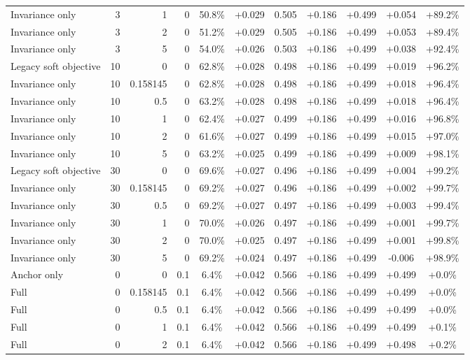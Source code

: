 \begin{table}[htbp]
\begin{tabular}{lrrrccccccc}
Invariance only & 3 & 1 & 0 & 50.8\% & +0.029 & 0.505 & +0.186 & +0.499 & +0.054 & +89.2\% \\
Invariance only & 3 & 2 & 0 & 51.2\% & +0.029 & 0.505 & +0.186 & +0.499 & +0.053 & +89.4\% \\
Invariance only & 3 & 5 & 0 & 54.0\% & +0.026 & 0.503 & +0.186 & +0.499 & +0.038 & +92.4\% \\
Legacy soft objective & 10 & 0 & 0 & 62.8\% & +0.028 & 0.498 & +0.186 & +0.499 & +0.019 & +96.2\% \\
Invariance only & 10 & 0.158145 & 0 & 62.8\% & +0.028 & 0.498 & +0.186 & +0.499 & +0.018 & +96.4\% \\
Invariance only & 10 & 0.5 & 0 & 63.2\% & +0.028 & 0.498 & +0.186 & +0.499 & +0.018 & +96.4\% \\
Invariance only & 10 & 1 & 0 & 62.4\% & +0.027 & 0.499 & +0.186 & +0.499 & +0.016 & +96.8\% \\
Invariance only & 10 & 2 & 0 & 61.6\% & +0.027 & 0.499 & +0.186 & +0.499 & +0.015 & +97.0\% \\
Invariance only & 10 & 5 & 0 & 63.2\% & +0.025 & 0.499 & +0.186 & +0.499 & +0.009 & +98.1\% \\
Legacy soft objective & 30 & 0 & 0 & 69.6\% & +0.027 & 0.496 & +0.186 & +0.499 & +0.004 & +99.2\% \\
Invariance only & 30 & 0.158145 & 0 & 69.2\% & +0.027 & 0.496 & +0.186 & +0.499 & +0.002 & +99.7\% \\
Invariance only & 30 & 0.5 & 0 & 69.2\% & +0.027 & 0.497 & +0.186 & +0.499 & +0.003 & +99.4\% \\
Invariance only & 30 & 1 & 0 & 70.0\% & +0.026 & 0.497 & +0.186 & +0.499 & +0.001 & +99.7\% \\
Invariance only & 30 & 2 & 0 & 70.0\% & +0.025 & 0.497 & +0.186 & +0.499 & +0.001 & +99.8\% \\
Invariance only & 30 & 5 & 0 & 69.2\% & +0.024 & 0.497 & +0.186 & +0.499 & -0.006 & +98.9\% \\
Anchor only & 0 & 0 & 0.1 & 6.4\% & +0.042 & 0.566 & +0.186 & +0.499 & +0.499 & +0.0\% \\
Full & 0 & 0.158145 & 0.1 & 6.4\% & +0.042 & 0.566 & +0.186 & +0.499 & +0.499 & +0.0\% \\
Full & 0 & 0.5 & 0.1 & 6.4\% & +0.042 & 0.566 & +0.186 & +0.499 & +0.499 & +0.0\% \\
Full & 0 & 1 & 0.1 & 6.4\% & +0.042 & 0.566 & +0.186 & +0.499 & +0.499 & +0.1\% \\
Full & 0 & 2 & 0.1 & 6.4\% & +0.042 & 0.566 & +0.186 & +0.499 & +0.498 & +0.2\% \\

\end{tabular}
\end{table}
